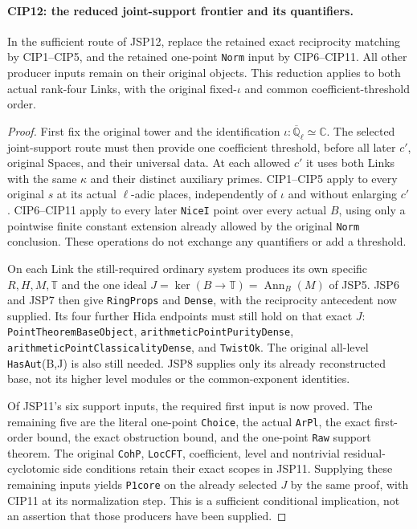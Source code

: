 \paragraph{CIP12: the reduced joint-support frontier and its quantifiers.}
\label{claim:CIP12}
In the sufficient route of JSP12, replace the retained exact
reciprocity matching by CIP1--CIP5, and the retained one-point
\texttt{Norm} input by CIP6--CIP11.  All other producer inputs
remain on their original objects.  This reduction applies to both
actual rank-four Links, with the original fixed-$\iota$ and common
coefficient-threshold order.
\begin{proof}
First fix the original tower and the identification
$\iota:\overline{\mathbb Q}_\ell\simeq\mathbb C$.
The selected joint-support route must then provide one coefficient
threshold, before all later $c'$, original Spaces, and their
universal data.  At each allowed $c'$ it uses both Links with the
same $\kappa$ and their distinct auxiliary primes.  CIP1--CIP5
apply to every original $s$ at its actual $\ell$-adic places,
independently of $\iota$ and without enlarging $c'$.
CIP6--CIP11 apply to every later \texttt{NiceI} point over every
actual $B$, using only a pointwise finite constant extension already
allowed by the original \texttt{Norm} conclusion.  These operations
do not exchange any quantifiers or add a threshold.

On each Link the still-required ordinary system produces its own
specific $R,H,M,\mathbb T$ and the one ideal
$J=\ker(B\to\mathbb T)=\operatorname{Ann}_B(M)$ of JSP5.
JSP6 and JSP7 then give \texttt{RingProps} and \texttt{Dense},
with the reciprocity antecedent now supplied.  Its four further
Hida endpoints must still hold on that exact $J$:
\texttt{PointTheoremBaseObject},
\texttt{arithmeticPointPurityDense},
\texttt{arithmeticPointClassicalityDense}, and \texttt{TwistOk}.
The original all-level \texttt{HasAut}(B,J) is also still needed.
JSP8 supplies only its already reconstructed base, not its higher
level modules or the common-exponent identities.

Of JSP11's six support inputs, the required first input is now
proved.  The remaining five are the literal one-point
\texttt{Choice}, the actual \texttt{ArPl}, the exact first-order
bound, the exact obstruction bound, and the one-point \texttt{Raw}
support theorem.  The original \texttt{CohP}, \texttt{LocCFT},
coefficient, level and nontrivial residual-cyclotomic side
conditions retain their exact scopes in JSP11.  Supplying these
remaining inputs yields \texttt{P1core} on the already selected
$J$ by the same proof, with CIP11 at its normalization step.
This is a sufficient conditional implication, not an assertion
that those producers have been supplied.


\end{proof}
